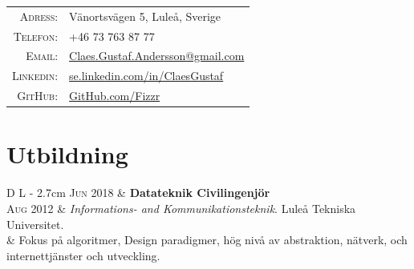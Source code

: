 \documentclass[a4paper,10pt]{article}
\begin{document}
\begin{tabular}{Dl}
    \textsc{Adress:}	&	 Vänortsvägen 5, Luleå, Sverige \\
    \textsc{Telefon:}		&	 +46 73 763 87 77\\
    \textsc{Email:}		&	 \href{mailto:Claes.Gustaf.Andersson@gmail.com}{Claes.Gustaf.Andersson@gmail.com}\\
    \textsc{Linkedin:}	&	 \url{se.linkedin.com/in/ClaesGustaf} \\
    \textsc{GitHub:}		&	 \href{https://github.com/Fizzr}{GitHub.com/Fizzr}
\end{tabular}


\section{Utbildning}
\begin{tabular}{D L {\textwidth - 2.7cm}}
\textsc{Jun 2018}	&	\textbf{Datateknik Civilingenjör}\\
\textsc{Aug 2012}	&	 \emph{Informations- and Kommunikationsteknik}. Luleå Tekniska Universitet.\\
			&	{\small Fokus på algoritmer, Design paradigmer, hög nivå av abstraktion, nätverk, och internettjänster och utveckling.}
\end{tabular}


\end{document}
